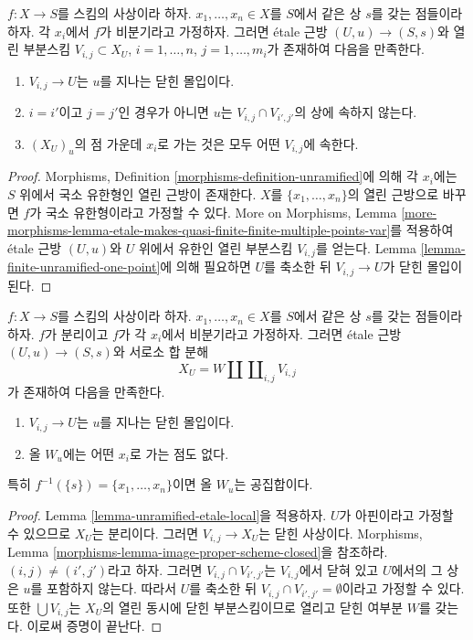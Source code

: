 \begin{lemma}
\label{lemma-unramified-etale-local}
$f : X \to S$를 스킴의 사상이라 하자.
$x_1, \ldots, x_n \in X$를 $S$에서 같은 상 $s$를 갖는 점들이라 하자.
각 $x_i$에서 $f$가 비분기라고 가정하자.
그러면 \'etale 근방 $(U, u) \to (S, s)$와 열린 부분스킴
$V_{i, j} \subset X_U$, $i = 1, \ldots, n$, $j = 1, \ldots, m_i$가 존재하여
다음을 만족한다.
\begin{enumerate}
\item $V_{i, j} \to U$는 $u$를 지나는 닫힌 몰입이다.
\item $i = i'$이고 $j = j'$인 경우가 아니면
$u$는 $V_{i, j} \cap V_{i', j'}$의 상에 속하지 않는다.
\item $(X_U)_u$의 점 가운데 $x_i$로 가는 것은 모두 어떤 $V_{i, j}$에 속한다.
\end{enumerate}
\end{lemma}

\begin{proof}
Morphisms, Definition \ref{morphisms-definition-unramified}에 의해
각 $x_i$에는 $S$ 위에서 국소 유한형인 열린 근방이 존재한다.
$X$를 $\{x_1, \ldots, x_n\}$의 열린 근방으로 바꾸면
$f$가 국소 유한형이라고 가정할 수 있다. More on Morphisms, Lemma
\ref{more-morphisms-lemma-etale-makes-quasi-finite-finite-multiple-points-var}를
적용하여 \'etale 근방 $(U, u)$와 $U$ 위에서 유한인 열린 부분스킴
$V_{i, j}$를 얻는다. Lemma \ref{lemma-finite-unramified-one-point}에 의해
필요하면 $U$를 축소한 뒤 $V_{i, j} \to U$가 닫힌 몰입이 된다.
\end{proof}

\begin{lemma}
\label{lemma-unramified-etale-local-technical}
$f : X \to S$를 스킴의 사상이라 하자.
$x_1, \ldots, x_n \in X$를 $S$에서 같은 상 $s$를 갖는 점들이라 하자.
$f$가 분리이고 $f$가 각 $x_i$에서 비분기라고 가정하자.
그러면 \'etale 근방 $(U, u) \to (S, s)$와 서로소 합 분해
$$
X_U =
W \amalg \coprod\nolimits_{i, j} V_{i, j}
$$
가 존재하여 다음을 만족한다.
\begin{enumerate}
\item $V_{i, j} \to U$는 $u$를 지나는 닫힌 몰입이다.
\item 올 $W_u$에는 어떤 $x_i$로 가는 점도 없다.
\end{enumerate}
특히 $f^{-1}(\{s\}) = \{x_1, \ldots, x_n\}$이면 올 $W_u$는 공집합이다.
\end{lemma}

\begin{proof}
Lemma \ref{lemma-unramified-etale-local}을 적용하자.
$U$가 아핀이라고 가정할 수 있으므로 $X_U$는 분리이다.
그러면 $V_{i, j} \to X_U$는 닫힌 사상이다. Morphisms, Lemma
\ref{morphisms-lemma-image-proper-scheme-closed}을 참조하라.
$(i, j) \not = (i', j')$라고 하자.
그러면 $V_{i, j} \cap V_{i', j'}$는 $V_{i, j}$에서 닫혀 있고
$U$에서의 그 상은 $u$를 포함하지 않는다. 따라서 $U$를 축소한 뒤
$V_{i, j} \cap V_{i', j'} = \emptyset$이라고 가정할 수 있다.
또한 $\bigcup V_{i, j}$는 $X_U$의 열린 동시에 닫힌 부분스킴이므로
열리고 닫힌 여부분 $W$를 갖는다. 이로써 증명이 끝난다.
\end{proof}


